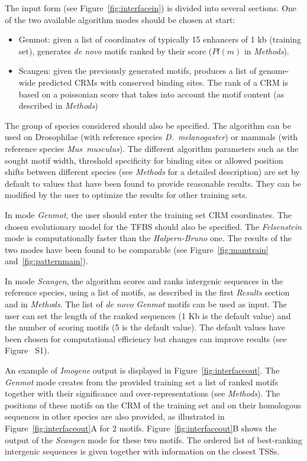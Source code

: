 \documentclass[a4,center,fleqn]{NAR}
\begin{document}
The input form (see Figure~\ref{fig:interfacein}) is divided into several
sections. 
One of the two available algorithm modes should be chosen at start:
\begin{itemize}
    \item Genmot: given a list of coordinates of typically 15 enhancers of 1 kb
      (training set), generates \textit{de novo} motifs ranked by their score
      ($Pl(m)$ in {\em Methods}). 
    \item Scangen: given the previously generated motifs, produces a list of
        genome-wide predicted CRMs with conserved binding sites.
        The rank of a CRM is based on a poissonian score that takes into
        account the motif content  (as described in {\em Methods})
\end{itemize}
The group of species considered should also be specified.
The algorithm can be used on Drosophilae (with reference species
\textit{D.~melanogaster}) or mammals (with reference species
\textit{Mus~musculus}).
The different algorithm parameters such as the sought motif width, threshold
specificity for binding sites or allowed position shifts between different
species (see {\em Methods} for a detailed description) are set by default to
values that have been found to provide reasonable results.
They can  be modified by the user to optimize the results for other training
sets. 

In mode {\em Genmot}, the user should enter the training set CRM coordinates.
The chosen evolutionary model for the TFBS should also be specified.
The {\em Felsenstein} mode is computationally faster than the {\em
Halpern-Bruno} one.
The results of the two modes have been found to be comparable (see
Figure~\ref{fig:mamtrain} and~\ref{fig:patternmam}).

In mode {\em Scangen}, the algorithm scores and ranks intergenic sequences in
the reference species, using a list of motifs, as described in the first {\em
Results} section and in {\em Methods}.
The list of {\em de novo}  {\em Genmot}  motifs can be used as input.
The user can set the length of the ranked sequences (1 Kb is the default value)
and the number of scoring  motifs (5 is the default value).
The default values have been chosen for computational
efficiency but changes can improve results (see Figure~
S1).

An example of {\em Imogene} output is displayed in
Figure~\ref{fig:interfaceout}.
The {\em Genmot} mode creates from the provided training set a list of ranked
motifs together with their significance and over-representations (see {\em
Methods}).
The positions of these motifs on the CRM of the training set and on their
homologous sequences in other species are also provided, as illustrated in
Figure~\ref{fig:interfaceout}A for 2 motifs.
Figure~\ref{fig:interfaceout}B shows the output of the {\em Scangen} mode for
these two motifs.
The ordered list of best-ranking intergenic sequences is given together with
information on the closest TSSs.
\end{document}

